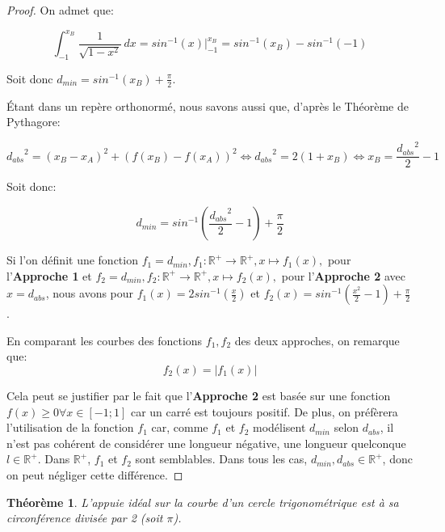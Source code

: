 \documentclass{amsart}
\newtheorem{theorem}{Théorème}[section]
\theoremstyle{definition}
\theoremstyle{remark}
\numberwithin{equation}{section}
\begin{document}
\begin{proof}
  On admet que:

  \[\int_{-1}^{x_B} \frac{1}{\sqrt{1-x^2}}\,dx=sin^{-1}(x)\Biggr|_{-1}^{x_B}=sin^{-1}(x_B)-sin^{-1}(-1)\]

  Soit donc $d_{min}=sin^{-1}(x_B)+\frac{\pi}{2}$.
  
  Étant dans un repère orthonormé, nous savons aussi que, d'après le Théorème de Pythagore:
  
  \[{d_{abs}}^2=(x_B-x_A)^2+(f(x_B)-f(x_A))^2 \Leftrightarrow {d_{abs}}^2=2(1+x_B) \Leftrightarrow x_B=\frac{{d_{abs}}^2}{2}-1\]

  Soit donc:

  \[d_{min}=sin^{-1}(\frac{{d_{abs}}^2}{2}-1)+\frac{\pi}{2}\]

  Si l'on définit une fonction $f_1=d_{min}, f_1:\mathbb{R^+}\longrightarrow \mathbb{R^+}, x\longmapsto f_1(x),$ pour l'\textbf{Approche 1} et $f_2=d_{min}, f_2:\mathbb{R^+}\longrightarrow \mathbb{R^+}, x\longmapsto f_2(x),$ pour l'\textbf{Approche 2} avec $x=d_{abs}$, nous avons pour $f_1(x)=2sin^{-1}(\frac{x}{2})$ et $f_2(x)=sin^{-1}(\frac{x^2}{2}-1)+\frac{\pi}{2}$.

  En comparant les courbes des fonctions $f_1,f_2$ des deux approches, on remarque que: \[f_2(x)=\lvert f_1(x) \rvert\]

  Cela peut se justifier par le fait que l'\textbf{Approche 2} est basée sur une fonction $f(x)\geq0 \forall x\in[-1;1]$ car un carré est toujours positif. De plus, on préfèrera l'utilisation de la fonction $f_1$ car, comme $f_1$ et $f_2$ 
  modélisent $d_{min}$ selon $d_{abs}$, il n'est pas cohérent de considérer une longueur négative, une longueur quelconque $l\in\mathbb{R^+}$. Dans $\mathbb{R^+}$, $f_1$ et $f_2$ sont semblables. Dans tous les cas, $d_{min},d_{abs}\in\mathbb{R^+}$, donc on peut négliger cette différence.
\end{proof}

\begin{theorem}
  L'appuie idéal sur la courbe d'un cercle trigonométrique est à sa circonférence divisée par 2 (soit $\pi$).
\end{theorem}
\end{document}
